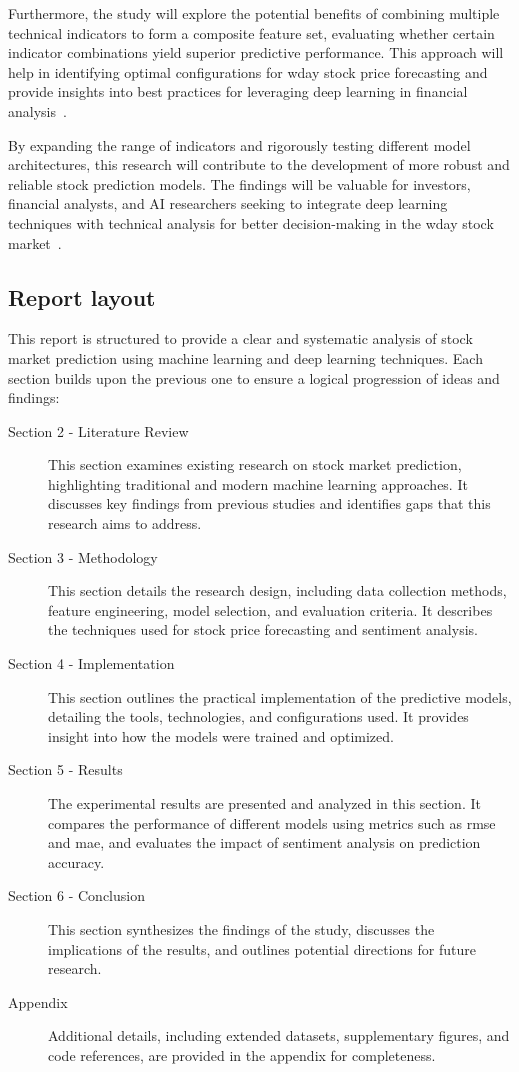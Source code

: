 Furthermore, the study will explore the potential benefits of combining multiple technical indicators to form a 
composite feature set, evaluating whether certain indicator combinations yield superior predictive performance. 
This approach will help in identifying optimal configurations for \acrshort{wday} stock price forecasting and provide 
insights into best practices for leveraging deep learning in financial 
analysis~\parencite{balasubramanian2023SystematicSurvey, shaban2024SMPDL}.

By expanding the range of indicators and rigorously testing different model architectures, this research will 
contribute to the development of more robust and reliable stock prediction models. The findings will be 
valuable for investors, financial analysts, and AI researchers seeking to integrate deep learning techniques 
with technical analysis for better decision-making in the \acrshort{wday} stock
market~\parencite{guo2024LSTMStock, agrawal2022StockPrediction}.

\subsection{Report layout}

This report is structured to provide a clear and systematic analysis of stock 
market prediction using machine learning and deep learning techniques. Each 
section builds upon the previous one to ensure a logical progression of ideas 
and findings:

\begin{description}
\item [Section 2 - Literature Review] This section examines existing research 
on stock market prediction, highlighting traditional and modern machine 
learning approaches. It discusses key findings from previous studies and 
identifies gaps that this research aims to address.
\item [Section 3 - Methodology] This section details the research design, 
including data collection methods, feature engineering, model selection, and 
evaluation criteria. It describes the techniques used for stock price
forecasting and sentiment analysis.
\item[Section 4 - Implementation] This section outlines the practical 
implementation of the predictive models, detailing the tools, 
technologies, and configurations used. It provides insight into how the
models were trained and optimized.
\item[Section 5 - Results] The experimental results are presented and analyzed 
in this section. It compares the performance of different models using metrics 
such as \acrshort{rmse} and \acrshort{mae}, and evaluates the impact of 
sentiment analysis on prediction accuracy.
\item[Section 6 - Conclusion] This section synthesizes the findings of the 
study, discusses the implications of the results, and outlines potential 
directions for future research.
\item[Appendix] Additional details, including extended datasets, supplementary 
figures, and code references, are provided in the appendix for completeness.
\end{description}



